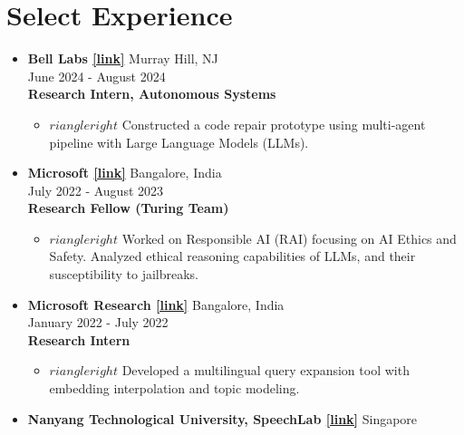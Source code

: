 \documentclass[11pt,letterpaper]{article}
\begin{document}
\section*{Select Experience}
\begin{itemize}[leftmargin=*,label={},itemsep=4pt]
    \item \textbf{Bell Labs  \href{https://www.bell-labs.com/}{[link]}} \hfill Murray Hill, NJ\\
        \hfill June 2024 - August 2024\\
        \textbf{\textit{} Research Intern, Autonomous Systems}\\
        \begin{itemize}
        \item $	riangleright$ Constructed a code repair prototype using multi-agent pipeline with Large Language Models (LLMs).\\
        \end{itemize}
    \item \textbf{Microsoft  \href{https://www.microsoft.com/en-in/research/theme/artificial-intelligence/}{[link]}} \hfill Bangalore, India\\
        \hfill July 2022 - August 2023\\
        \textbf{\textit{} Research Fellow (Turing Team)}\\
        \begin{itemize}
        \item $	riangleright$ Worked on Responsible AI (RAI) focusing on AI Ethics and Safety. Analyzed ethical reasoning capabilities of LLMs, and their susceptibility to jailbreaks.\\
        \end{itemize}
    \item \textbf{Microsoft Research  \href{https://www.microsoft.com/en-us/research/}{[link]}} \hfill Bangalore, India\\
        \hfill January 2022 - July 2022\\
        \textbf{\textit{} Research Intern}\\
        \begin{itemize}
        \item $	riangleright$ Developed a multilingual query expansion tool with embedding interpolation and topic modeling.\\
        \end{itemize}
    \item \textbf{Nanyang Technological University, SpeechLab  \href{https://www.ntu.edu.sg/speechlab}{[link]}} \hfill Singapore\\

\end{itemize}
\end{document}
